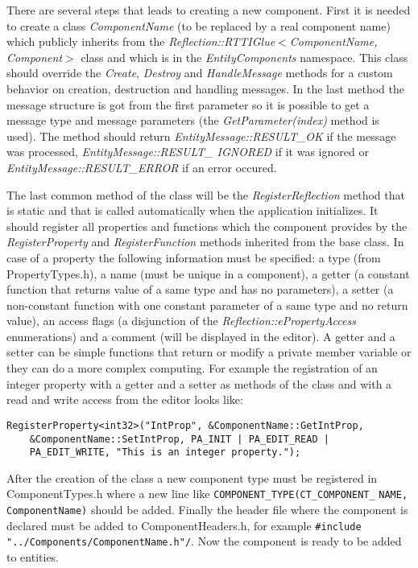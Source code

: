 There are several steps that leads to creating a new component. First it is needed to create a class \emph{ComponentName} (to be replaced by a real component name) which publicly inherits from the \emph{Reflection::RTTIGlue$<$Component\-Name, Component$>$} class and which is in the \emph{EntityComponents} namespace. This class should override the \emph{Create}, \emph{Destroy} and \emph{HandleMessage} methods for a custom behavior on creation, destruction and handling messages. In the last method the message structure is got from the first parameter so it is possible to get a message type and message parameters (the \emph{GetParameter(index)} method is used). The method should return \emph{EntityMessage::RESULT\_OK} if the message was processed, \emph{EntityMessage::RESULT\_ IGNORED} if it was ignored or \emph{EntityMessage::RESULT\_ERROR} if an error occured.

The last common method of the class will be the \emph{RegisterReflection} me\-thod that is static and that is called automatically when the application initializes. It should register all properties and functions which the component provides by the \emph{RegisterProperty} and \emph{RegisterFunction} methods inherited from the base class. In case of a property the following information must be specified: a type (from PropertyTypes.h), a name (must be unique in a component), a getter (a constant function that returns value of a same type and has no parameters), a setter (a non-constant function with one constant parameter of a same type and no return value), an access flags (a disjunction of the \emph{Reflection::ePropertyAccess} enumerations) and a comment (will be displayed in the editor). A getter and a setter can be simple functions that return or modify a private member variable or they can do a more complex computing. For example the registration of an integer property with a getter and a setter as methods of the class and with a read and write access from the editor looks like:
\begin{verbatim}
RegisterProperty<int32>("IntProp", &ComponentName::GetIntProp,
    &ComponentName::SetIntProp, PA_INIT | PA_EDIT_READ |
    PA_EDIT_WRITE, "This is an integer property.");
\end{verbatim}

After the creation of the class a new component type must be registered in ComponentTypes.h where a new line like \verb/COMPONENT_TYPE(CT_COMPONENT_/ \verb/NAME, ComponentName)/ should be added. Finally the header file where the component is declared must be added to ComponentHeaders.h, for example \verb|#include "../Components/ComponentName.h"/|. Now the component is ready to be added to entities.

